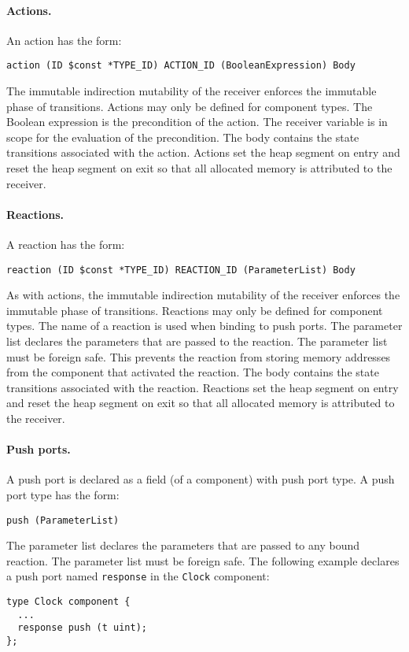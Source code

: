 \paragraph{Actions.}
An action has the form:
\begin{verbatim}
action (ID $const *TYPE_ID) ACTION_ID (BooleanExpression) Body
\end{verbatim}
The immutable indirection mutability of the receiver enforces the immutable phase of transitions.
Actions may only be defined for component types.
The Boolean expression is the precondition of the action.
The receiver variable is in scope for the evaluation of the precondition.
The body contains the state transitions associated with the action.
Actions set the heap segment on entry and reset the heap segment on exit so that all allocated memory is attributed to the receiver.

\paragraph{Reactions.}
A reaction has the form:
\begin{verbatim}
reaction (ID $const *TYPE_ID) REACTION_ID (ParameterList) Body
\end{verbatim}
As with actions, the immutable indirection mutability of the receiver enforces the immutable phase of transitions.
Reactions may only be defined for component types.
The name of a reaction is used when binding to push ports.
The parameter list declares the parameters that are passed to the reaction.
The parameter list must be foreign safe.
This prevents the reaction from storing memory addresses from the component that activated the reaction.
The body contains the state transitions associated with the reaction.
Reactions set the heap segment on entry and reset the heap segment on exit so that all allocated memory is attributed to the receiver.

\paragraph{Push ports.}
A push port is declared as a field (of a component) with push port type.
A push port type has the form:
\begin{verbatim}
push (ParameterList)
\end{verbatim}
The parameter list declares the parameters that are passed to any bound reaction.
The parameter list must be foreign safe.
The following example declares a push port named \verb+response+ in the \verb+Clock+ component:
\begin{verbatim}
type Clock component {
  ...
  response push (t uint);
};
\end{verbatim}

